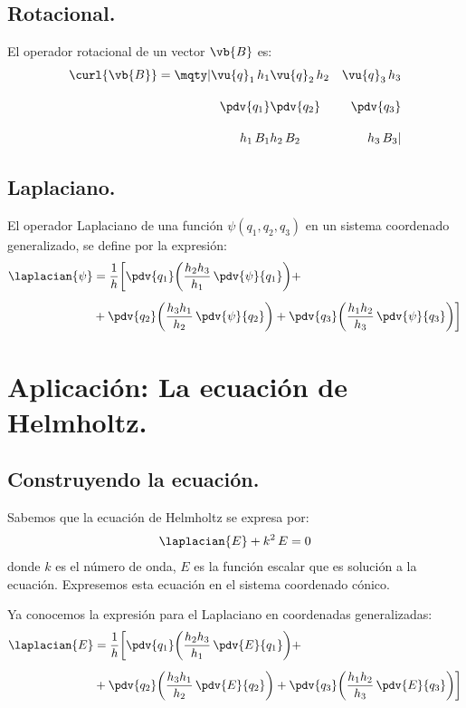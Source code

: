 \subsection{Rotacional.}

El operador rotacional de un vector $\vb{B}$ es:
\begin{align*}
\curl{\vb{B}} = \mqty|
\vu{q}_{1} \, h_{1} & \vu{q}_{2} \, h_{2} & \vu{q}_{3} \, h_{3} \\[1em]
\displaystyle \pdv{q_{1}} & \displaystyle \pdv{q_{2}} & \displaystyle \pdv{q_{3}} \\[1em]
h_{1} \, B_{1} & h_{2} \, B_{2} & h_{3} \, B_{3}
|
\end{align*}

\subsection{Laplaciano.}

El operador Laplaciano de una función $\psi (q_{1}, q_{2}, q_{3})$ en un sistema coordenado generalizado, se define por la expresión:
\begin{align*}
\laplacian{\psi} &= \dfrac{1}{h} \bigg[ \pdv{q_{1}} \bigg( \dfrac{h_{2} h_{3}}{h_{1}} \, \pdv{\psi}{q_{1}} \bigg) + \\[0.5em]
&+ \pdv{q_{2}} \bigg( \dfrac{h_{3} h_{1}}{h_{2}} \, \pdv{\psi}{q_{2}} \bigg) + \pdv{q_{3}} \bigg( \dfrac{h_{1} h_{2}}{h_{3}} \, \pdv{\psi}{q_{3}} \bigg) \bigg]
\end{align*}

\section{Aplicación: La ecuación de Helmholtz.}

\subsection{Construyendo la ecuación.}

Sabemos que la ecuación de Helmholtz se expresa por:
\begin{align*}
\laplacian{E} + k^{2} \, E = 0
\end{align*}
donde $k$ es el número de onda, $E$ es la función escalar que es solución a la ecuación. Expresemos esta ecuación en el sistema coordenado cónico.
\par
Ya conocemos la expresión para el Laplaciano en coordenadas generalizadas:
\begin{align*}
\laplacian{E} &= \dfrac{1}{h} \bigg[ \pdv{q_{1}} \bigg( \dfrac{h_{2} h_{3}}{h_{1}} \, \pdv{E}{q_{1}} \bigg) + \\[0.5em]
&+ \pdv{q_{2}} \bigg( \dfrac{h_{3} h_{1}}{h_{2}} \, \pdv{E}{q_{2}} \bigg) + \pdv{q_{3}} \bigg( \dfrac{h_{1} h_{2}}{h_{3}} \, \pdv{E}{q_{3}} \bigg) \bigg]
\end{align*}

